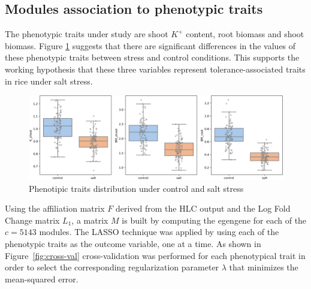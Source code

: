 \documentclass[12pt,journal, onecolumn]{IEEEtran}
\begin{document}
\subsection{Modules association to phenotypic traits}
The phenotypic traits under study are shoot $K^+$ content, root biomass and shoot biomass. Figure \ref{fig:pdata} suggests that there are significant differences in the values of these phenotypic traits between stress and control conditions. This supports the working hypothesis that these three variables represent tolerance-associated traits in rice under salt stress.

\begin{figure}[h]
  \centering
    \includegraphics[clip,width=1\textwidth]{Figures/phenotypic_traits.png}
  \caption{Phenotipic traits distribution under control and salt stress}
  \label{fig:pdata}
\end{figure}

Using the affiliation matrix $F$ derived from the HLC output and the Log Fold Change matrix $L_1$, a matrix $M$ is built by computing the egengene for each of the $c = 5143$ modules. The LASSO technique was applied by using each of the phenotypic traits as the outcome variable, one at a time. As shown in Figure~\ref{fig:cross-val} cross-validation was performed for each phenotypical trait in order to select the corresponding regularization parameter $\lambda$ that minimizes the mean-squared error.\\

\end{document}
